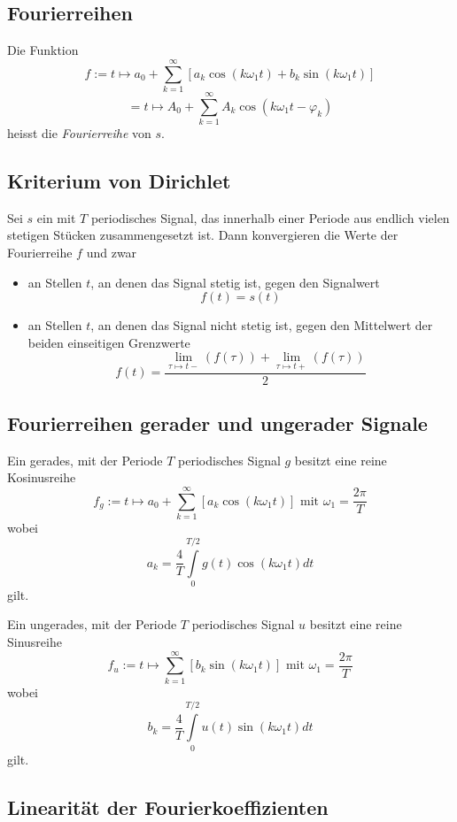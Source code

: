 \documentclass[10pt,a4paper]{scrartcl}
\begin{document}
\subsection{Fourierreihen}

Die Funktion
$$f := t \mapsto a_0 + \sum_{k=1}^{\infty} \left[a_k \cos(k\omega_1t) + b_k \sin(k\omega_1t)\right]$$
$$= t \mapsto A_0 + \sum_{k=1}^{\infty} A_k \cos(k\omega_1 t - \varphi_k)$$
heisst die \textit{Fourierreihe} von $s$.


\subsection{Kriterium von Dirichlet}

Sei $s$ ein mit $T$ periodisches Signal, das innerhalb einer Periode aus
endlich vielen stetigen Stücken zusammengesetzt ist. Dann konvergieren die
Werte der Fourierreihe $f$ und zwar
\begin{itemize}
\item an Stellen $t$, an denen das Signal stetig ist, gegen den Signalwert
$$f(t) = s(t)$$
\item an Stellen $t$, an denen das Signal nicht stetig ist, gegen den Mittelwert der beiden einseitigen Grenzwerte
$$f(t) = \frac{\lim\limits_{\tau \mapsto t-}(f(\tau)) + \lim\limits_{\tau \mapsto t+}(f(\tau))}{2}$$
\end{itemize}


\subsection{Fourierreihen gerader und ungerader Signale}

Ein gerades, mit der Periode $T$ periodisches Signal $g$ besitzt eine reine
Kosinusreihe
$$f_g := t \mapsto a_0 + \sum_{k=1}^{\infty} \left[ a_k \cos(k\omega_1t)\right] \textrm{ mit } \omega_1 = \frac{2\pi}{T}$$
wobei
$$a_k = \frac{4}{T} \int\limits_0^{T/2} g(t) \cos(k\omega_1t) dt$$
gilt.

Ein ungerades, mit der Periode $T$ periodisches Signal $u$ besitzt eine reine
Sinusreihe
$$f_u := t \mapsto \sum_{k=1}^{\infty} \left[ b_k \sin(k\omega_1t)\right] \textrm{ mit } \omega_1 = \frac{2\pi}{T}$$
wobei
$$b_k = \frac{4}{T} \int\limits_0^{T/2} u(t) \sin(k\omega_1t) dt$$
gilt.


\subsection{Linearität der Fourierkoeffizienten}
\end{document}
